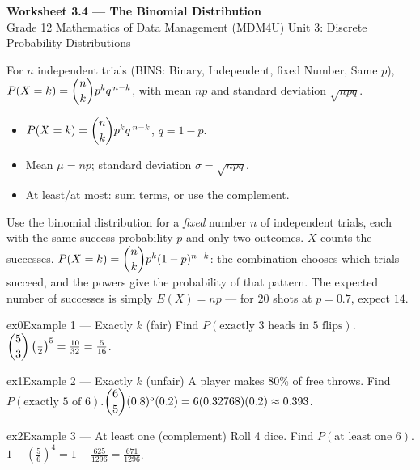 \documentclass[11pt]{article}
\begin{document}
\begin{center}
{\LARGE\bfseries\color{titleblue}Worksheet 3.4 --- The Binomial Distribution}\\[2pt]
{\small Grade 12 Mathematics of Data Management (MDM4U) \textperiodcentered{} Unit 3: Discrete Probability Distributions}
\end{center}

\begin{ideabox}
For $n$ independent trials (BINS: Binary, Independent, fixed Number, Same $p$), $P(X=k)=\dbinom{n}{k}p^{k}q^{\,n-k}$, with mean $np$ and standard deviation $\sqrt{npq}$.
\begin{itemize}[leftmargin=*,itemsep=2pt]
  \item $P(X=k)=\dbinom{n}{k}p^{k}q^{\,n-k}$, $q=1-p$.
  \item Mean $\mu=np$; standard deviation $\sigma=\sqrt{npq}$.
  \item At least/at most: sum terms, or use the complement.
\end{itemize}
\end{ideabox}

\begin{learnbox}
Use the binomial distribution for a \emph{fixed} number $n$ of independent trials, each with the same success probability $p$ and only two outcomes. $X$ counts the successes.
$P(X=k)=\dbinom{n}{k}p^{k}(1-p)^{n-k}$: the combination chooses which trials succeed, and the powers give the probability of that pattern.
The expected number of successes is simply $E(X)=np$ — for $20$ shots at $p=0.7$, expect $14$.
\end{learnbox}


\begin{example}{ex0}{Example 1 --- Exactly $k$ (fair)}
Find $P(\text{exactly 3 heads in 5 flips})$.\soln $\dbinom{5}{3}\left(\tfrac12\right)^5=\tfrac{10}{32}=\tfrac{5}{16}$.
\end{example}

\begin{example}{ex1}{Example 2 --- Exactly $k$ (unfair)}
A player makes 80\% of free throws. Find $P(\text{exactly 5 of 6})$.\soln $\dbinom{6}{5}(0.8)^5(0.2)=6(0.32768)(0.2)\approx0.393$.
\end{example}

\begin{example}{ex2}{Example 3 --- At least one (complement)}
Roll 4 dice. Find $P(\text{at least one 6})$.\soln $1-\left(\tfrac56\right)^4=1-\tfrac{625}{1296}=\tfrac{671}{1296}$.
\end{example}
\end{document}
